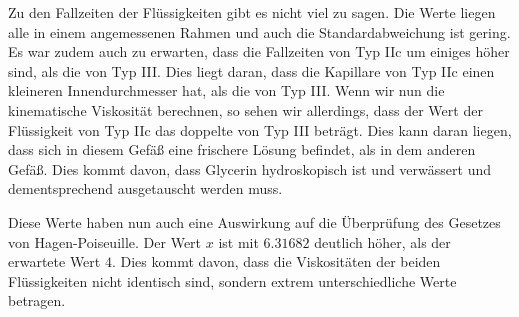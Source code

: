             Zu den Fallzeiten der Flüssigkeiten gibt es nicht viel zu sagen. Die Werte liegen alle in einem angemessenen Rahmen und auch die Standardabweichung ist gering. Es war zudem auch zu erwarten, dass die Fallzeiten von Typ IIc um einiges höher sind, als die von Typ III. Dies liegt daran, dass die Kapillare von Typ IIc einen kleineren Innendurchmesser hat, als die von Typ III. Wenn wir nun die kinematische Viskosität berechnen, so sehen wir allerdings, dass der Wert der Flüssigkeit von Typ IIc das doppelte von Typ III beträgt. Dies kann daran liegen, dass sich in diesem Gefäß eine frischere Lösung befindet, als in dem anderen Gefäß. Dies kommt davon, dass Glycerin hydroskopisch ist und verwässert und dementsprechend ausgetauscht werden muss.

            Diese Werte haben nun auch eine Auswirkung auf die Überprüfung des Gesetzes von Hagen-Poiseuille. Der Wert $x$ ist mit $6.31682$ deutlich höher, als der erwartete Wert $4$. Dies kommt davon, dass die Viskositäten der beiden Flüssigkeiten nicht identisch sind, sondern extrem unterschiedliche Werte betragen.